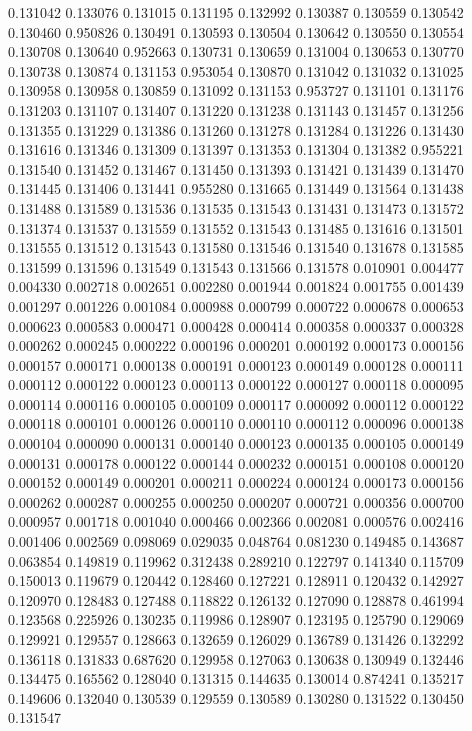 0.131042
0.133076
0.131015
0.131195
0.132992
0.130387
0.130559
0.130542
0.130460
0.950826
0.130491
0.130593
0.130504
0.130642
0.130550
0.130554
0.130708
0.130640
0.952663
0.130731
0.130659
0.131004
0.130653
0.130770
0.130738
0.130874
0.131153
0.953054
0.130870
0.131042
0.131032
0.131025
0.130958
0.130958
0.130859
0.131092
0.131153
0.953727
0.131101
0.131176
0.131203
0.131107
0.131407
0.131220
0.131238
0.131143
0.131457
0.131256
0.131355
0.131229
0.131386
0.131260
0.131278
0.131284
0.131226
0.131430
0.131616
0.131346
0.131309
0.131397
0.131353
0.131304
0.131382
0.955221
0.131540
0.131452
0.131467
0.131450
0.131393
0.131421
0.131439
0.131470
0.131445
0.131406
0.131441
0.955280
0.131665
0.131449
0.131564
0.131438
0.131488
0.131589
0.131536
0.131535
0.131543
0.131431
0.131473
0.131572
0.131374
0.131537
0.131559
0.131552
0.131543
0.131485
0.131616
0.131501
0.131555
0.131512
0.131543
0.131580
0.131546
0.131540
0.131678
0.131585
0.131599
0.131596
0.131549
0.131543
0.131566
0.131578
0.010901
0.004477
0.004330
0.002718
0.002651
0.002280
0.001944
0.001824
0.001755
0.001439
0.001297
0.001226
0.001084
0.000988
0.000799
0.000722
0.000678
0.000653
0.000623
0.000583
0.000471
0.000428
0.000414
0.000358
0.000337
0.000328
0.000262
0.000245
0.000222
0.000196
0.000201
0.000192
0.000173
0.000156
0.000157
0.000171
0.000138
0.000191
0.000123
0.000149
0.000128
0.000111
0.000112
0.000122
0.000123
0.000113
0.000122
0.000127
0.000118
0.000095
0.000114
0.000116
0.000105
0.000109
0.000117
0.000092
0.000112
0.000122
0.000118
0.000101
0.000126
0.000110
0.000110
0.000112
0.000096
0.000138
0.000104
0.000090
0.000131
0.000140
0.000123
0.000135
0.000105
0.000149
0.000131
0.000178
0.000122
0.000144
0.000232
0.000151
0.000108
0.000120
0.000152
0.000149
0.000201
0.000211
0.000224
0.000124
0.000173
0.000156
0.000262
0.000287
0.000255
0.000250
0.000207
0.000721
0.000356
0.000700
0.000957
0.001718
0.001040
0.000466
0.002366
0.002081
0.000576
0.002416
0.001406
0.002569
0.098069
0.029035
0.048764
0.081230
0.149485
0.143687
0.063854
0.149819
0.119962
0.312438
0.289210
0.122797
0.141340
0.115709
0.150013
0.119679
0.120442
0.128460
0.127221
0.128911
0.120432
0.142927
0.120970
0.128483
0.127488
0.118822
0.126132
0.127090
0.128878
0.461994
0.123568
0.225926
0.130235
0.119986
0.128907
0.123195
0.125790
0.129069
0.129921
0.129557
0.128663
0.132659
0.126029
0.136789
0.131426
0.132292
0.136118
0.131833
0.687620
0.129958
0.127063
0.130638
0.130949
0.132446
0.134475
0.165562
0.128040
0.131315
0.144635
0.130014
0.874241
0.135217
0.149606
0.132040
0.130539
0.129559
0.130589
0.130280
0.131522
0.130450
0.131547
